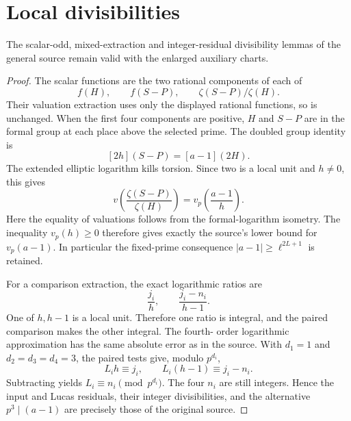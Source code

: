 \documentclass[11pt,a4paper]{article}
\begin{document}
\section{Local divisibilities}
\begin{lemma}\label{lem:local}
The scalar-odd, mixed-extraction and integer-residual divisibility
lemmas of the general source remain valid with the enlarged
auxiliary charts.
\end{lemma}
\begin{proof}
The scalar functions are the two rational components of each of
\[
 f(H),\qquad f(S-P),\qquad \zeta(S-P)/\zeta(H).
\]
Their valuation extraction uses only the displayed rational
functions, so is unchanged. When the first four components are
positive, $H$ and $S-P$ are in the formal group at each place
above the selected prime. The doubled group identity is
\[
 [2h](S-P)=[a-1](2H).
\]
The extended elliptic logarithm kills torsion. Since two is a
local unit and $h\ne0$, this gives
\[
 v\!\left(\frac{\zeta(S-P)}{\zeta(H)}\right)
       =v_p\!\left(\frac{a-1}{h}\right).
\]
Here the equality of valuations follows from the formal-logarithm
isometry. The inequality $v_p(h)\ge0$ therefore gives exactly the
source's lower bound for $v_p(a-1)$. In particular the fixed-prime
consequence $|a-1|\ge\ell^{2L+1}$ is retained.

For a comparison extraction, the exact logarithmic ratios are
\[
 \frac{j_i}{h},\qquad\frac{j_i-n_i}{h-1}.
\]
One of $h,h-1$ is a local unit. Therefore one ratio is integral,
and the paired comparison makes the other integral. The fourth-
order logarithmic approximation has the same absolute error as in
the source. With $d_1=1$ and $d_2=d_3=d_4=3$, the paired tests
give, modulo $p^{d_i}$,
\[
 L_i h\equiv j_i,\qquad
 L_i(h-1)\equiv j_i-n_i.
\]
Subtracting yields $L_i\equiv n_i\pmod{p^{d_i}}$.
The four $n_i$ are still integers. Hence the input and Lucas
residuals, their integer divisibilities, and the alternative
$p^3\mid(a-1)$ are precisely those of the original source.
\end{proof}
\end{document}
